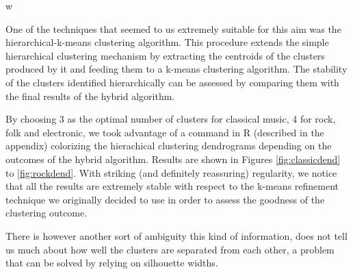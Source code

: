 w\documentclass[11pt, oneside]{article}
\begin{document}
One of the techniques that seemed to us extremely suitable for this aim was the hierarchical-k-means clustering algorithm. This procedure extends the simple hierarchical clustering mechanism by extracting the centroids of the clusters produced by it and feeding them to a k-means clustering algorithm. The stability of the clusters identified hierarchically can be assessed by comparing them with the final results of the hybrid algorithm.

By choosing 3 as the optimal number of clusters for classical music, 4 for rock, folk and electronic, we took advantage of a command in R (described in the appendix) colorizing the hierachical clustering dendrograms depending on the outcomes of the hybrid algorithm. Results are shown in Figures \ref{fig:classicdend} to \ref{fig:rockdend}. With striking (and definitely reassuring) regularity, we notice that all the results are extremely stable with respect to the k-means refinement technique we originally decided to use in order to assess the goodness of the clustering outcome.

There is however another sort of ambiguity this kind of information, does not tell us much about how well the clusters are separated from each other, a problem that can be solved by relying on silhouette widths.
\end{document}
